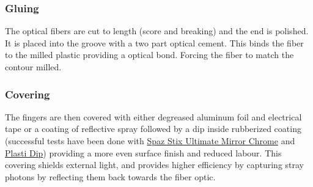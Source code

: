 \subsubsection{Gluing}
The optical fibers are cut to length (score and breaking) and the end is polished. It is placed into the groove with a two part optical cement. This binds the fiber to the milled plastic providing a optical bond. Forcing the fiber to match the contour milled.


\subsubsection{Covering}
The fingers are then covered with either degreased aluminum foil and electrical tape or a coating of reflective spray followed by a dip inside rubberized coating (successful tests have been done with \href{http://www.hobbyrecreationproducts.com/collections/spazstix-ultimate-mirror-chrome}{Spaz Stix Ultimate Mirror Chrome} and \href{https://plastidip.com/}{Plasti Dip}) providing a more even surface finish and reduced labour. This covering shields external light, and provides higher efficiency by capturing stray photons by reflecting them back towards the fiber optic. 

\pagebreak